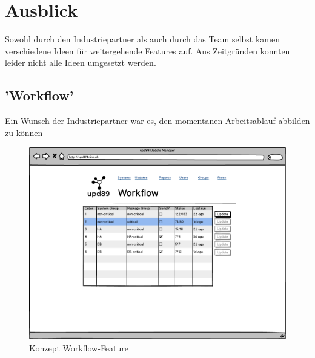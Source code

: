 \chapter{Ausblick}

Sowohl durch den Industriepartner als auch durch das Team selbst kamen verschiedene Ideen für weitergehende Features auf. Aus Zeitgründen konnten leider nicht alle Ideen umgesetzt werden.

\section{'Workflow'}

Ein Wunsch der Industriepartner war es, den momentanen Arbeitsablauf abbilden zu können



\begin{figure}[H]
	\centering
	\includegraphics[width=\linewidth]{files/workflow_clean}
	\caption{Konzept Workflow-Feature}
	\label{fig:ausblick:workflow}
\end{figure}



